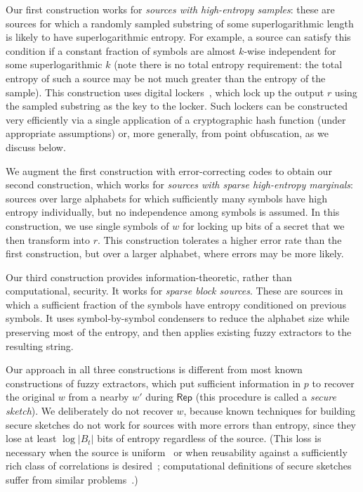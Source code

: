 \documentclass[11pt]{article}
\newcommand{\class}[1]{{\ensuremath{\mathsf{#1}}}}
\newcommand{\rep}{\ensuremath{\class{Rep}}\xspace}
\begin{document}
Our first construction works for \emph{sources with high-entropy samples}: these are sources for which a randomly sampled substring of some superlogarithmic length is likely to have superlogarithmic  entropy. For example, a source can satisfy this condition if a constant fraction of symbols are almost $k$-wise independent for some superlogarithmic $k$ (note there is no total entropy requirement:  the total entropy of such a source may be not  much greater than the entropy of the sample). This construction uses digital lockers~\cite{canetti2008obfuscating}, which lock up the output $r$ using the sampled substring as the key to the locker. Such lockers can be constructed very efficiently via a single application of a cryptographic hash function (under appropriate assumptions) or, more generally, from point obfuscation, as we discuss below.

We augment the first construction with error-correcting codes to obtain our second construction, which works for \emph{sources with sparse high-entropy marginals}: sources over large alphabets for which sufficiently many symbols have high entropy individually, but no independence among symbols is assumed. In this construction, we use single symbols of $w$ for locking up bits of a secret that we then transform into $r$. This construction tolerates a higher error rate than the first construction, but over a larger alphabet, where errors may be more likely. 

Our third construction provides information-theoretic, rather than computational, security. It works for \emph{sparse block sources}. These are sources in which a sufficient fraction of the symbols have entropy conditioned on previous symbols. It uses symbol-by-symbol condensers to reduce the alphabet size while preserving most of the entropy, and then applies existing fuzzy extractors to the resulting string.

Our approach in all three constructions is different from most known constructions of fuzzy extractors, which put sufficient information in $p$ to recover the original $w$ from a nearby $w'$ during $\rep$ (this procedure is called a \emph{secure sketch}). We deliberately do not recover $w$, because known techniques for building secure sketches do not work for sources with more errors than entropy, since they lose at least $\log |B_t|$ bits of entropy regardless of the source. (This loss is necessary when the source is uniform~\cite[Lemma C.1]{DBLP:journals/siamcomp/DodisORS08} or when reusability against a sufficiently rich class of correlations is desired~\cite[Theorem 11]{Boyen2004}; computational definitions of secure sketches suffer from similar problems~\cite[Corollary 3.8, Theorem 3.10]{fuller2013computational}.)
\end{document}

